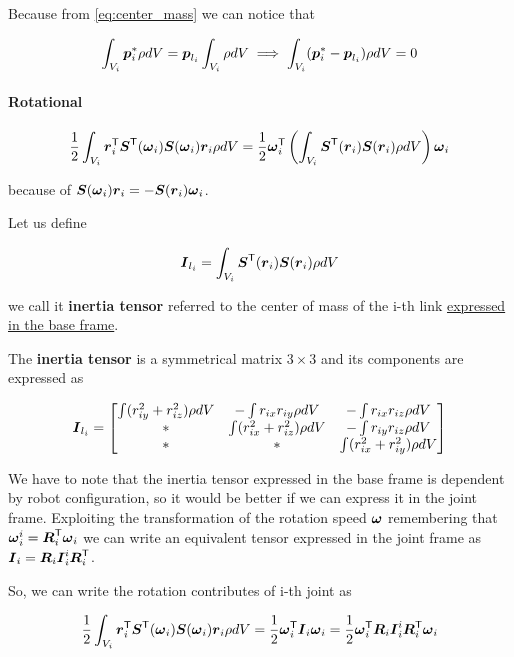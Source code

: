 Because from \autoref{eq:center_mass} we can notice that

\[
	\int_{V_i} \boldsymbol{p}_i^* \rho dV = \boldsymbol{p}_{l_i} \int_{V_i} \rho dV
	\implies
	\int_{V_i} (\boldsymbol{p}_i^* - \boldsymbol{p}_{l_i}) \rho dV = 0
\]

\paragraph{Rotational}

\[
	\frac{1}{2} \int_{V_i} \boldsymbol{r}_i^{\mathsf{T}} \boldsymbol{S}^{\mathsf{T}}(\boldsymbol{\omega}_i) \boldsymbol{S}(\boldsymbol{\omega}_i) \boldsymbol{r}_i \rho dV =
	\frac{1}{2} \boldsymbol{\omega}_i^{\mathsf{T}} \left( \int_{V_i} \boldsymbol{S}^{\mathsf{T}}(\boldsymbol{r}_i) \boldsymbol{S}(\boldsymbol{r}_i) \rho dV \right) \boldsymbol{\omega}_i
\]

because of $\boldsymbol{S}(\boldsymbol{\omega}_i) \boldsymbol{r}_i = - \boldsymbol{S}(\boldsymbol{r}_i)\boldsymbol{\omega}_i$.

Let us define

\[ \boldsymbol{I}_{l_i} = \int_{V_i} \boldsymbol{S}^{\mathsf{T}}(\boldsymbol{r}_i) \boldsymbol{S}(\boldsymbol{r}_i) \rho dV \]

we call it \textbf{inertia tensor} referred to the center of mass of the i-th link \underline{expressed in the base frame}.

The \textbf{inertia tensor} is a symmetrical matrix $3 \times 3$ and its components are expressed as

\[
	\boldsymbol{I}_{l_i} =
	\begin{bmatrix}
		\int (r_{iy}^2 + r_{iz}^2) \rho dV & - \int r_{ix}r_{iy} \rho dV & - \int r_{ix}r_{iz} \rho dV \\
		* & \int (r_{ix}^2 + r_{iz}^2) \rho dV & - \int r_{iy}r_{iz} \rho dV \\
		* & * & \int (r_{ix}^2 + r_{iy}^2) \rho dV
	\end{bmatrix}
\]

We have to note that the inertia tensor expressed in the base frame is dependent by robot configuration, so it would be better if we can express it in the joint frame.
Exploiting the transformation of the rotation speed $\boldsymbol{\omega}$ remembering that $\boldsymbol{\omega}_i^i = \boldsymbol{R}_i^{\mathsf{T}}\boldsymbol{\omega}_i$ we can write an equivalent tensor expressed in the joint frame as $\boldsymbol{I}_i=\boldsymbol{R}_i \boldsymbol{I}_i^i \boldsymbol{R}_i^{\mathsf{T}}$.

So, we can write the rotation contributes of i-th joint as

\[
	\frac{1}{2} \int_{V_i} \boldsymbol{r}_i^{\mathsf{T}} \boldsymbol{S}^{\mathsf{T}}(\boldsymbol{\omega}_i) \boldsymbol{S}(\boldsymbol{\omega}_i) \boldsymbol{r}_i \rho dV =
	\frac{1}{2} \boldsymbol{\omega}_i^{\mathsf{T}} \boldsymbol{I}_i \boldsymbol{\omega}_i =
	\frac{1}{2} \boldsymbol{\omega}_i^{\mathsf{T}} \boldsymbol{R}_i \boldsymbol{I}_i^i \boldsymbol{R}_i^{\mathsf{T}} \boldsymbol{\omega}_i
\]


